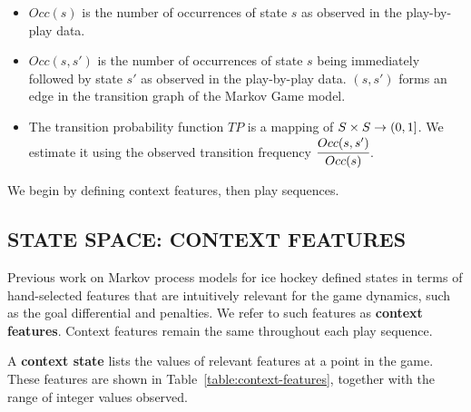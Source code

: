 \documentclass[]{article}
\begin{document}
\begin{itemize}
\item $Occ(s)$ is the number of occurrences of state $s$ as observed in the play-by-play data.
\item $Occ(s,s')$ is the number of occurrences of state $s$ being immediately followed by state $s'$ as observed in the play-by-play data. $(s,s')$ forms an edge in the transition graph of the Markov Game model.
\item The transition probability function $TP$ is a mapping of $S \times S \rightarrow (0,1]$. We estimate it using the observed transition frequency $\cfrac{Occ(s,s')}{Occ(s)}$.
\end{itemize}

We begin by defining context features, then play sequences.


\subsection{STATE SPACE: CONTEXT FEATURES}
\label{subsec:context}

Previous work on Markov process models for ice hockey \citep{Thomas2013} defined states in terms of hand-selected features that are intuitively relevant for the game dynamics, such as the goal differential and penalties.
We refer to such features as \textbf{context features}. Context features remain the same throughout each play sequence.


A \textbf{context state} lists the values of relevant features at a point in the game. These features are shown in Table~\ref{table:context-features}, together with the range of integer values observed.
\end{document}
